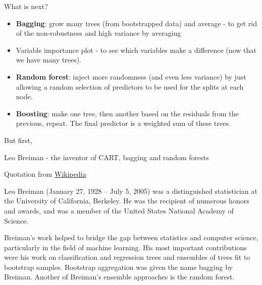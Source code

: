 \documentclass[10pt,ignorenonframetext,]{beamer}
\providecommand{\tightlist}{%
  \setlength{\itemsep}{0pt}\setlength{\parskip}{0pt}}
\begin{document}
\begin{frame}

\begin{block}{What is next?}

\begin{itemize}
\tightlist
\item
  \textbf{Bagging}: grow many trees (from bootstrapped data) and average
  - to get rid of the non-robustness and high variance by averaging
\item
  Variable importance plot - to see which variables make a difference
  (now that we have many trees).
\item
  \textbf{Random forest}: inject more randomness (and even less
  variance) by just allowing a random selection of predictors to be used
  for the splits at each node.
\item
  \textbf{Boosting}: make one tree, then another based on the residuals
  from the previous, repeat. The final predictor is a weighted sum of
  these trees.
\end{itemize}

\end{block}

\end{frame}

\begin{frame}

But first,

\begin{block}{Leo Breiman - the inventor of CART, bagging and random
forests}

Quotation from
\href{https://en.wikipedia.org/wiki/Leo_Breiman}{Wikipedia}

Leo Breiman (January 27, 1928 -- July 5, 2005) was a distinguished
statistician at the University of California, Berkeley. He was the
recipient of numerous honors and awards, and was a member of the United
States National Academy of Science.

Breiman's work helped to bridge the gap between statistics and computer
science, particularly in the field of machine learning. His most
important contributions were his work on classification and regression
trees and ensembles of trees fit to bootstrap samples. Bootstrap
aggregation was given the name bagging by Breiman. Another of Breiman's
ensemble approaches is the random forest.

\end{block}

\end{frame}
\end{document}
